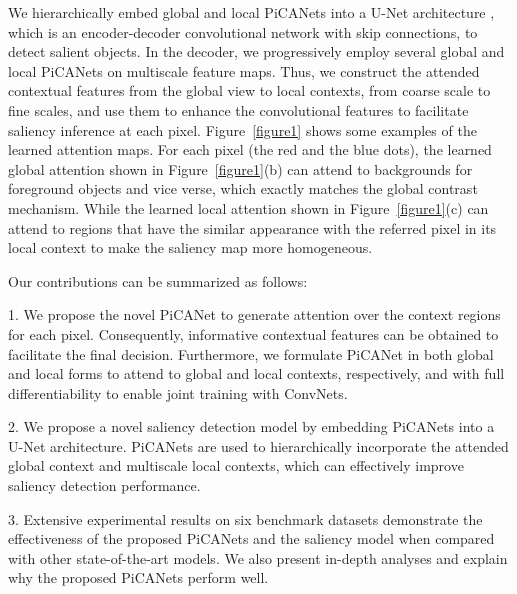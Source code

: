\documentclass[10pt,twocolumn,letterpaper]{article}
\begin{document}
We hierarchically embed global and local PiCANets into a U-Net architecture \cite{ronneberger2015unet}, which is an encoder-decoder convolutional network with skip connections, to detect salient objects.
%
In the decoder, we progressively employ several global and local PiCANets on multiscale feature maps.
%
Thus, we construct the attended contextual features from the global view to local contexts, from coarse scale to fine scales, and use them to enhance the convolutional features to facilitate saliency inference at each pixel.
%
Figure~\ref{figure1} shows some examples of the learned attention maps.
%
For each pixel (the red and the blue dots), the learned global attention shown in  Figure~\ref{figure1}(b) can attend to backgrounds for foreground objects and vice verse, which exactly matches the global contrast mechanism.
%
While the learned local attention shown in  Figure~\ref{figure1}(c) can attend to regions that have the similar appearance with the referred pixel in its local context to make the saliency map more homogeneous.

Our contributions can be summarized as follows:

1. We propose the novel PiCANet to 
generate attention over the context regions for each pixel. Consequently, informative contextual features can be obtained to facilitate the final decision. 
Furthermore,
we formulate PiCANet in both global and local forms to attend to global and local contexts, respectively, and with full differentiability to enable joint training with ConvNets.
%

2.  We propose a novel saliency detection model by embedding PiCANets into a U-Net architecture. PiCANets are used to hierarchically incorporate the attended global context and multiscale local contexts, which can effectively improve saliency detection performance.

3.  Extensive experimental results on six benchmark datasets demonstrate the effectiveness of the proposed PiCANets and the saliency model when compared with other state-of-the-art models.
%
We also present in-depth analyses and explain why the proposed PiCANets perform well.

\end{document}
